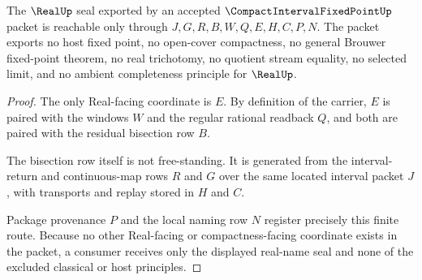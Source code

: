 \begin{theorem}
\label{thm:compact-interval-fixed-point-real-seal-nonescape}
The $\RealUp$ seal exported by an accepted $\CompactIntervalFixedPointUp$ packet is reachable only through $J,G,R,B,W,Q,E,H,C,P,N$. The packet exports no host fixed point, no open-cover compactness, no general Brouwer fixed-point theorem, no real trichotomy, no quotient stream equality, no selected limit, and no ambient completeness principle for $\RealUp$.
\end{theorem}
\begin{proof}
The only Real-facing coordinate is $E$. By definition of the carrier, $E$ is paired with the windows $W$ and the regular rational readback $Q$, and both are paired with the residual bisection row $B$.

The bisection row itself is not free-standing. It is generated from the interval-return and continuous-map rows $R$ and $G$ over the same located interval packet $J$, with transports and replay stored in $H$ and $C$.

Package provenance $P$ and the local naming row $N$ register precisely this finite route. Because no other Real-facing or compactness-facing coordinate exists in the packet, a consumer receives only the displayed real-name seal and none of the excluded classical or host principles.
\end{proof}


